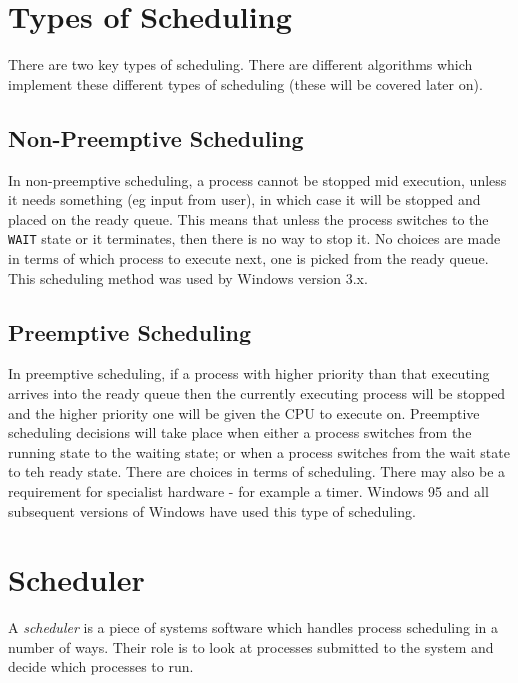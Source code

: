 \section{Types of Scheduling}
There are two key types of scheduling. There are different algorithms which implement these different types of scheduling (these will be covered later on).
\subsection{Non-Preemptive Scheduling}
In non-preemptive scheduling, a process cannot be stopped mid execution, unless it needs something (eg input from user), in which case it will be stopped and placed on the ready queue. This means that unless the process switches to the \verb|WAIT| state or it terminates, then there is no way to stop it. No choices are made in terms of which process to execute next, one is picked from the ready queue. This scheduling method was used by Windows version 3.x.

\subsection{Preemptive Scheduling}
In preemptive scheduling, if a process with higher priority than that executing arrives into the ready queue then the currently executing process will be stopped and the higher priority one will be given the CPU to execute on. Preemptive scheduling decisions will take place when either a process switches from the running state to the waiting state; or when a process switches from the wait state to teh ready state. There are choices in terms of scheduling. There may also be a requirement for specialist hardware - for example a timer. Windows 95 and all subsequent versions of Windows have used this type of scheduling. 

\section{Scheduler}
A \textit{scheduler} is a piece of systems software which handles process scheduling in a number of ways. Their role is to look at processes submitted to the system and decide which processes to run. 